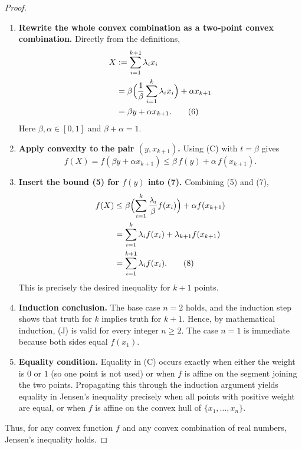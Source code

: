 \begin{proof}
\begin{enumerate}
\item[\textbf{6.}] \textbf{Rewrite the whole convex combination as a two‑point
convex combination.}  Directly from the definitions,
\begin{align*}
X&:=\sum_{i=1}^{k+1}\lambda_i x_i \\
  &=\beta\Bigl(\frac{1}{\beta}\sum_{i=1}^{k}\lambda_i x_i\Bigr)+\alpha x_{k+1}\\
  &=\beta y+\alpha x_{k+1}. \tag{6}
\end{align*}
Here \(\beta,\alpha\in[0,1]\) and \(\beta+\alpha=1\).

\item[\textbf{7.}] \textbf{Apply convexity to the pair \((y,x_{k+1})\).}
Using (C) with \(t=\beta\) gives
\[
f(X)=f(\beta y+\alpha x_{k+1})
   \le \beta\,f(y)+\alpha\,f(x_{k+1}). \tag{7}
\]

\item[\textbf{8.}] \textbf{Insert the bound (5) for \(f(y)\) into (7).}
Combining (5) and (7),
\begin{align*}
f(X) &\le \beta\Bigl(\sum_{i=1}^{k}\frac{\lambda_i}{\beta}f(x_i)\Bigr)
        +\alpha f(x_{k+1})\\
     &= \sum_{i=1}^{k}\lambda_i f(x_i)+\lambda_{k+1}f(x_{k+1})\\
     &= \sum_{i=1}^{k+1}\lambda_i f(x_i). \tag{8}
\end{align*}
This is precisely the desired inequality for \(k+1\) points.

\item[\textbf{9.}] \textbf{Induction conclusion.}  The base case \(n=2\) holds,
and the induction step shows that truth for \(k\) implies truth for \(k+1\).
Hence, by mathematical induction, (J) is valid for every integer
\(n\ge2\).  The case \(n=1\) is immediate because both sides equal
\(f(x_{1})\).

\item[\textbf{10.}] \textbf{Equality condition.}  Equality in (C) occurs exactly
when either the weight is \(0\) or \(1\) (so one point is not used) or when
\(f\) is affine on the segment joining the two points.  Propagating this
through the induction argument yields equality in Jensen’s inequality
precisely when all points with positive weight are equal, or when \(f\) is
affine on the convex hull of \(\{x_{1},\dots ,x_{n}\}\).

\end{enumerate}
Thus, for any convex function \(f\) and any convex combination of real
numbers, Jensen’s inequality holds.
\end{proof}